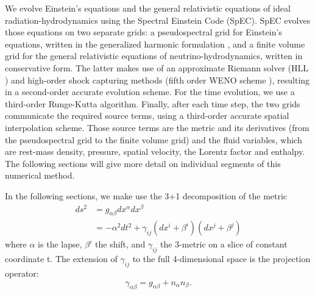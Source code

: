 We evolve Einstein's equations and the general relativistic equations of ideal radiation-hydrodynamics using the Spectral Einstein Code (SpEC)\cite{specwebsite}. SpEC evolves those equations on
two separate grids: a pseudospectral grid for Einstein's equations, written in the generalized harmonic formulation \cite{lindblom2006},
and a finite volume grid for the general relativistic equations
of neutrino-hydrodynamics, written in conservative form. The latter
makes use of an approximate Riemann solver (HLL \cite{hll})
and high-order shock capturing methods (fifth order WENO
scheme \cite{liu1994200,jiang1996202}), resulting in a second-order accurate evolution scheme. For the time evolution, we use a third-order
Runge-Kutta algorithm. Finally, after each time step, the two
grids communicate the required source terms, using a third-order accurate spatial interpolation scheme. Those source terms are the metric and its derivatives (from the pseudospectral grid to the finite volume grid) and the fluid variables, which are rest-mass density, pressure, spatial velocity, the Lorentz factor and enthalpy. The following sections will give more detail on individual segments of this numerical method.

In the following sections, we make use the 3+1 decomposition of the metric
%
\begin{align}
  ds^2 &= g_{\alpha\beta}dx^\alpha dx^\beta \\
  &= -\alpha^2dt^2 + \gamma_{ij}(dx^i + \beta^i)(dx^j + \beta^j)
\end{align}
%
where $\alpha$ is the lapse, $\beta^i$ the shift, and $\gamma_{ij}$ the 3-metric on a slice of constant coordinate t. The extension of $\gamma_{ij}$ to the full 4-dimensional space is the projection operator:
%
\begin{equation}
  \gamma_{\alpha\beta} = g_{\alpha\beta} + n_\alpha n_\beta.
\end{equation}
%



